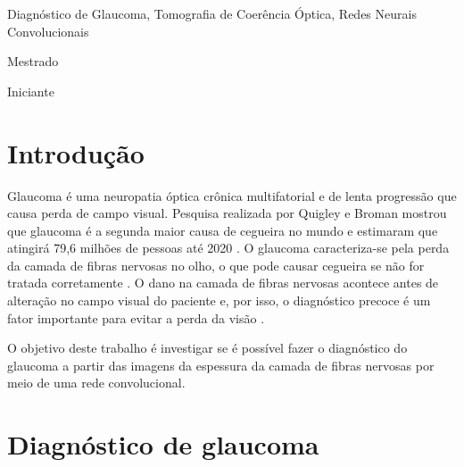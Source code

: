 \documentclass[conference]{IEEEtran}
\begin{document}
\renewcommand\IEEEkeywordsname{Palavras-chave}
\begin{IEEEkeywords}
\label{Palavras-chave}
Diagnóstico de Glaucoma, Tomografia de Coerência Óptica, Redes Neurais Convolucionais
\end{IEEEkeywords}

\renewcommand\IEEEkeywordsname{Classifica\c{c}\~{a}o}
\begin{IEEEkeywords}
	\label{classificacao}
	Mestrado
\end{IEEEkeywords}

\renewcommand\IEEEkeywordsname{Categoria}
\begin{IEEEkeywords}
	\label{Categoria}
	Iniciante 
\end{IEEEkeywords}

\IEEEpeerreviewmaketitle


\section{Introdução}



Glaucoma é uma neuropatia óptica crônica multifatorial e de lenta progressão que causa perda de campo visual. Pesquisa realizada por Quigley e Broman mostrou que glaucoma é a segunda maior causa de cegueira no mundo e estimaram que atingirá 79,6 milhões de pessoas até 2020 \cite{Quigley2006}. O glaucoma caracteriza-se pela perda da camada de fibras nervosas no olho, o que pode causar cegueira se não for tratada corretamente \cite{Quigley2011}. O dano na camada de fibras nervosas acontece antes de alteração no campo visual do paciente e, por isso, o diagnóstico precoce é um fator importante para evitar a perda da visão \cite{Malik2012}.

O objetivo deste trabalho é investigar se é possível fazer o diagnóstico do glaucoma a partir das imagens da espessura da camada de fibras nervosas por meio de uma rede convolucional.

\section{Diagnóstico de glaucoma}

\end{document}
